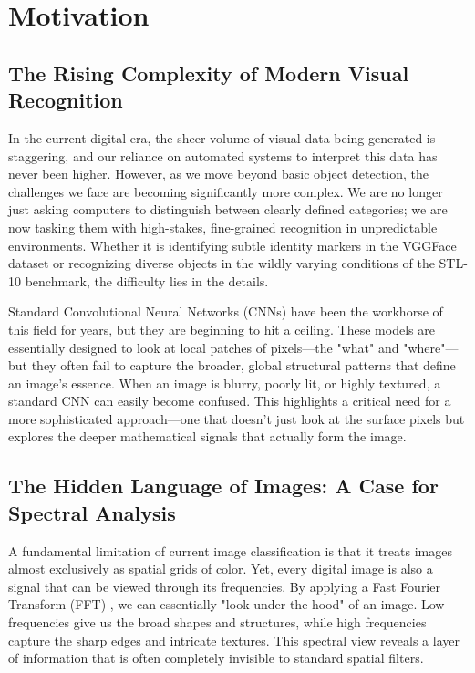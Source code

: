 \chapter{Motivation}

\section{The Rising Complexity of Modern Visual Recognition}

In the current digital era, the sheer volume of visual data being generated is staggering, and our reliance on automated systems to interpret this data has never been higher. However, as we move beyond basic object detection, the challenges we face are becoming significantly more complex. We are no longer just asking computers to distinguish between clearly defined categories; we are now tasking them with high-stakes, fine-grained recognition in unpredictable environments. Whether it is identifying subtle identity markers in the VGGFace dataset or recognizing diverse objects in the wildly varying conditions of the STL-10 benchmark, the difficulty lies in the details. 

Standard Convolutional Neural Networks (CNNs) have been the workhorse of this field for years, but they are beginning to hit a ceiling. These models are essentially designed to look at local patches of pixels—the "what" and "where"—but they often fail to capture the broader, global structural patterns that define an image's essence. When an image is blurry, poorly lit, or highly textured, a standard CNN can easily become confused. This highlights a critical need for a more sophisticated approach—one that doesn't just look at the surface pixels but explores the deeper mathematical signals that actually form the image.

\section{The Hidden Language of Images: A Case for Spectral Analysis}

A fundamental limitation of current image classification is that it treats images almost exclusively as spatial grids of color. Yet, every digital image is also a signal that can be viewed through its frequencies. By applying a Fast Fourier Transform (FFT) \cite{fft}, we can essentially "look under the hood" of an image. Low frequencies give us the broad shapes and structures, while high frequencies capture the sharp edges and intricate textures. This spectral view reveals a layer of information that is often completely invisible to standard spatial filters.


